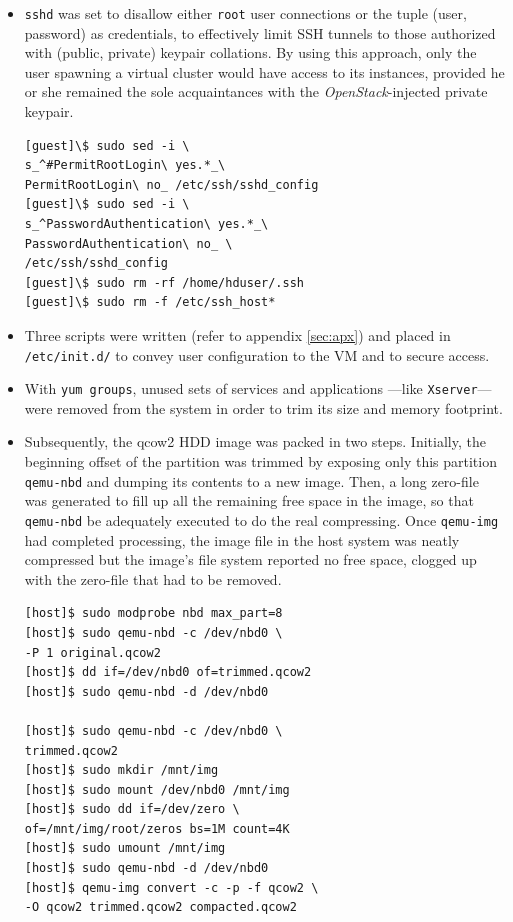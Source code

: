 \documentclass{sig-alternate}
\begin{document}
\begin{itemize}
 \item \texttt{sshd} was set to disallow either \texttt{root} user connections or the tuple (user, password) as credentials, to effectively limit SSH tunnels to those authorized with (public, private) keypair collations. By using this approach, only the user spawning a virtual cluster would have access to its instances, provided he or she remained the sole acquaintances with the \emph{OpenStack}-injected private keypair.
 
   \begin{verbatim}
[guest]\$ sudo sed -i \
s_^#PermitRootLogin\ yes.*_\
PermitRootLogin\ no_ /etc/ssh/sshd_config
[guest]\$ sudo sed -i \
s_^PasswordAuthentication\ yes.*_\
PasswordAuthentication\ no_ \
/etc/ssh/sshd_config
[guest]\$ sudo rm -rf /home/hduser/.ssh
[guest]\$ sudo rm -f /etc/ssh_host*
   \end{verbatim}
   
 \item Three scripts were written (refer to appendix \ref{sec:apx}) and placed in \texttt{/etc/init.d/} to convey user configuration to the VM and to secure access.
 
 \item With \texttt{yum groups}, unused sets of services and applications ---like \texttt{Xserver}--- were removed from the system in order to trim its size and memory footprint.
 
 \item Subsequently, the qcow2 HDD image was packed in two steps. Initially, the beginning offset of the partition was trimmed by exposing only this partition \texttt{qemu-nbd} and dumping its contents to a new image. Then, a long zero-file was generated to fill up all the remaining free space in the image, so that \texttt{qemu-nbd} be adequately executed to do the real compressing. Once \texttt{qemu-img} had completed processing, the image file in the host system was neatly compressed but the image's file system reported no free space, clogged up with the zero-file that had to be removed.
 
   \begin{verbatim}
[host]$ sudo modprobe nbd max_part=8
[host]$ sudo qemu-nbd -c /dev/nbd0 \
-P 1 original.qcow2
[host]$ dd if=/dev/nbd0 of=trimmed.qcow2
[host]$ sudo qemu-nbd -d /dev/nbd0

[host]$ sudo qemu-nbd -c /dev/nbd0 \
trimmed.qcow2
[host]$ sudo mkdir /mnt/img
[host]$ sudo mount /dev/nbd0 /mnt/img
[host]$ sudo dd if=/dev/zero \
of=/mnt/img/root/zeros bs=1M count=4K
[host]$ sudo umount /mnt/img
[host]$ sudo qemu-nbd -d /dev/nbd0
[host]$ qemu-img convert -c -p -f qcow2 \
-O qcow2 trimmed.qcow2 compacted.qcow2


\end{verbatim}
\end{itemize}
\end{document}
